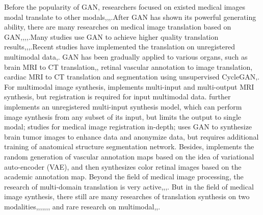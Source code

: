 \documentclass[letterpaper]{article} %
\begin{document}
Before the popularity of GAN, researchers focused on existed medical images modal translate to other modals\cite{22burgos2015robust},\cite{33huang2017simultaneous},\cite{34vemulapalli2015unsupervised},\cite{36vannguyen2015crossdomain}.After GAN has shown its powerful generating ability, there are many researches on medical image translation based on GAN\cite{2zhang2018translating},\cite{20nie2017medical},\cite{35osokin2017gans},\cite{36vannguyen2015crossdomain},\cite{40kamnitsas2017unsupervised}.Many studies use GAN to achieve higher quality translation results\cite{1zhao2018modular},\cite{5liang2018generative},\cite{6zhu2017unpaired},\cite{13choi2018stargan:}.Recent studies have implemented the translation on unregistered multimodal data\cite{2zhang2018translating},\cite{85joyce2017robust}.
GAN has been gradually applied to various organs, such as brain MRI to CT translation\cite{20nie2017medical},\cite{40kamnitsas2017unsupervised}, retinal vascular annotation to image translation\cite{41costa2017towards}, cardiac MRI to CT translation and segmentation using unsupervised CycleGAN\cite{6zhu2017unpaired},\cite{20nie2017medical}.
For multimodal image synthesis, \cite{84chartsias2018multimodal} implements multi-input and multi-output MRI synthesis, but registration is required for input multimodal data. \cite{85joyce2017robust} further implements an unregistered multi-input synthesis model, which can perform image synthesis from any subset of its input, but limits the output to single modal;\cite{66Miao2018dilated} studies for medical image registration in-depth;\cite{4shin2018medical} uses GAN to synthesize brain tumor images to enhance data and anonymize data, but requires additional training of anatomical structure segmentation network.
Besides,\cite{41costa2017towards} implements the random generation of vascular annotation maps based on the idea of variational auto-encoder (VAE)\cite{87kingma2014auto-encoding}, and then synthesizes color retinal images based on the academic annotation map.
Beyond the field of medical image processing, the research of multi-domain translation is very active\cite{1zhao2018modular},\cite{5liang2018generative},\cite{13choi2018stargan:},\cite{27isola2017image-to-image}.
But in the field of medical image synthesis, there still are many researches of translation synthesis on two modalities\cite{2zhang2018translating},\cite{20nie2017medical},\cite{22burgos2015robust},\cite{34vemulapalli2015unsupervised},\cite{35osokin2017gans},\cite{36vannguyen2015crossdomain},\cite{40kamnitsas2017unsupervised}, and rare research on multimodal\cite{84chartsias2018multimodal},\cite{85joyce2017robust},\cite{4shin2018medical}.
\end{document}
